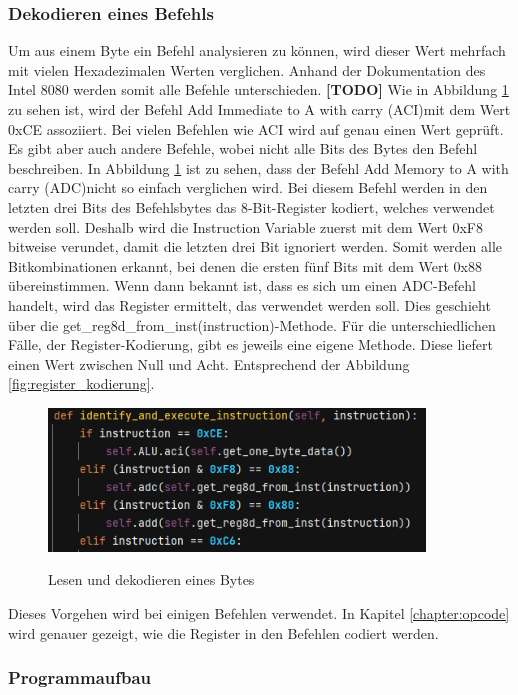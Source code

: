 \documentclass[12pt]{article}
\newcommand{\imgSpaceBefore}{\\[0.2cm]}
\begin{document}
\subsubsection{Dekodieren eines Befehls}
\noindent
Um aus einem Byte ein Befehl analysieren zu können, wird dieser Wert mehrfach mit vielen Hexadezimalen Werten verglichen. Anhand der Dokumentation des Intel 8080 werden somit alle Befehle unterschieden. 
\textbf{[TODO]} Wie in  Abbildung \ref{fig:ReadInstruction} zu sehen ist, wird der Befehl \glqq Add Immediate to A with carry (ACI)\grqq mit dem Wert 0xCE assoziiert.  
Bei vielen Befehlen wie ACI wird auf genau einen Wert geprüft. Es gibt aber auch andere Befehle, wobei nicht alle Bits des Bytes den Befehl beschreiben. In Abbildung \ref{fig:ReadInstruction} ist zu sehen, dass der Befehl \glqq Add Memory to A with carry (ADC)\grqq nicht so einfach verglichen wird. Bei diesem Befehl werden in den letzten drei Bits des Befehlsbytes das 8-Bit-Register kodiert, welches verwendet werden soll. Deshalb wird die Instruction Variable zuerst mit dem Wert 0xF8 bitweise verundet, damit die letzten drei Bit ignoriert werden. Somit werden alle Bitkombinationen erkannt, bei denen die ersten fünf Bits mit dem Wert 0x88 übereinstimmen. Wenn dann bekannt ist, dass es sich um einen ADC-Befehl handelt, wird das Register ermittelt, das verwendet werden soll. Dies geschieht über die get\_reg8d\_from\_inst(instruction)-Methode. Für die unterschiedlichen Fälle, der Register-Kodierung, gibt es jeweils eine eigene Methode. Diese liefert einen Wert zwischen Null und Acht. Entsprechend der Abbildung \ref{fig:register_kodierung}.
\imgSpaceBefore
\begin{figure}[h]
\caption{Lesen und dekodieren eines Bytes}
\centering
\includegraphics[width=10cm]{Bilder/ReadInstruction}
\label{fig:ReadInstruction}
\end{figure}

\noindent
Dieses Vorgehen wird bei einigen Befehlen verwendet. In Kapitel \ref{chapter:opcode} wird genauer gezeigt, wie die Register in den Befehlen codiert werden.


\subsubsection{Programmaufbau}
\label{chapter:MPS_aufbau}
\end{document}
